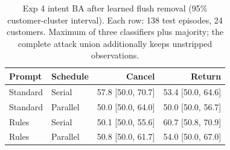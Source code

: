 \begin{table}[t]\centering\footnotesize
\caption{Exp 4 intent BA after learned flush removal (95\% customer-cluster interval). Each row: 138 test episodes, 24 customers. Maximum of three classifiers plus majority; the complete attack union additionally keeps unstripped observations.}\label{tab:r8-flush}
\begin{tabular}{@{}llrr@{}}\toprule
Prompt & Schedule & Cancel & Return\\\midrule
Standard & Serial & 57.8 [50.0, 70.7] & 53.4 [50.0, 64.6]\\
Standard & Parallel & 50.0 [50.0, 64.0] & 50.0 [50.0, 56.7]\\
Rules & Serial & 50.1 [50.0, 55.6] & 60.7 [50.8, 70.9]\\
Rules & Parallel & 50.8 [50.0, 61.7] & 54.0 [50.0, 67.0]\\
\bottomrule\end{tabular}
\end{table}
